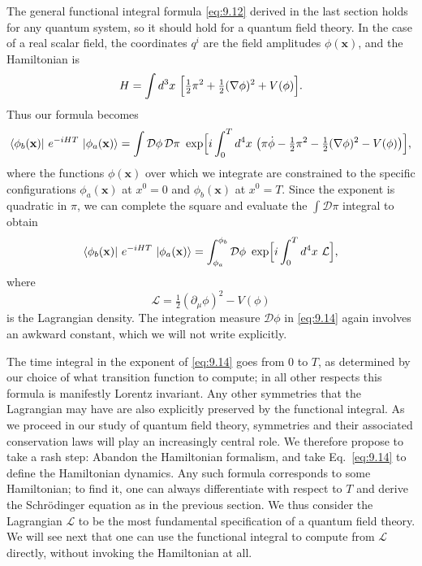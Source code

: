 The general functional integral formula \eqref{eq:9.12} derived in the last
section holds for any quantum system, so it should hold for a quantum field
theory.  In the case of a real scalar field, the coordinates $q^i$ are the
field amplitudes $\phi(\mathbf{x})$, and the Hamiltonian is
\begin{equation}
  H = \int d^3x\ \Bigl[ \tfrac{1}{2}\pi^2 + \tfrac{1}{2}(\nabla\phi)^2
    + V(\phi) \Bigr].
\end{equation}
Thus our formula becomes
\begin{equation}
  \langle \phi_b(\mathbf{x})|\ e^{-iHT}\ |\phi_a(\mathbf{x})\rangle
  = \int \mathcal{D}\phi\,\mathcal{D}\pi\ \exp\Bigl[ i\int_0^T d^4x\
    \bigl( \pi\dot{\phi} - \tfrac{1}{2}\pi^2 - \tfrac{1}{2}(\nabla\phi)^2
      - V(\phi) \bigr) \Bigr] ,
\end{equation}
where the functions $\phi(\mathbf{x})$ over which we integrate are constrained
to the specific configurations $\phi_a(\mathbf{x})$ at $x^0 = 0$ and
$\phi_b(\mathbf{x})$ at $x^0 = T$.  Since the exponent is quadratic in $\pi$,
we can complete the square and evaluate the $\int\mathcal{D}\pi$ integral to
obtain
\begin{equation}
  \langle \phi_b(\mathbf{x})|\ e^{-iHT}\ |\phi_a(\mathbf{x})\rangle
  = \int_{\phi_a}^{\phi_b} \mathcal{D}\phi\ \exp\Bigl[ i\int_0^T d^4x\
    \mathcal{L} \Bigr],
  \label{eq:9.14}
\end{equation}
where
\begin{equation}
  \mathcal{L} = \tfrac{1}{2}(\partial_\mu\phi)^2 - V(\phi)
\end{equation}
is the Lagrangian density.  The integration measure $\mathcal{D}\phi$ in
\eqref{eq:9.14} again involves an awkward constant, which we will not write
explicitly.

The time integral in the exponent of \eqref{eq:9.14} goes from 0 to $T$, as
determined by our choice of what transition function to compute; in all other
respects this formula is manifestly Lorentz invariant.  Any other symmetries
that the Lagrangian may have are also explicitly preserved by the functional
integral.  As we proceed in our study of quantum field theory, symmetries and
their associated conservation laws will play an increasingly central role.  We
therefore propose to take a rash step: Abandon the Hamiltonian formalism, and
take Eq.~\eqref{eq:9.14} to define the Hamiltonian dynamics.  Any such formula
corresponds to some Hamiltonian; to find it, one can always differentiate with
respect to $T$ and derive the Schr\"odinger equation as in the previous
section.  We thus consider the Lagrangian $\mathcal{L}$ to be the most
fundamental specification of a quantum field theory.  We will see next that
one can use the functional integral to compute from $\mathcal{L}$ directly,
without invoking the Hamiltonian at all.

